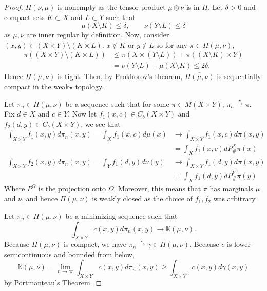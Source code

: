 \documentclass[12pt]{article}
\theoremstyle{plain}
\numberwithin{equation}{section}
\begin{document}
\begin{proof}
  $\Pi(\nu,\mu)$ is nonempty as the tensor product $\mu\otimes \nu$ is in $\Pi$. Let $\delta > 0$ and compact sets $K\subset X$ and $L\subset Y$ such that 
  \[\mu(X\setminus K) \le \delta,\qquad \nu(Y\setminus L)\le \delta\]
  as $\mu,\nu$ are inner regular by definition. Now, consider $(x,y)\in (X\times Y)\setminus (K\times L)$. $x\notin K$ or $y\notin L$ so for any $\pi\in\Pi(\mu,\nu)$, 
  \begin{align*}
    \pi((X\times Y)\setminus (K\times L)) &\le \pi(X\times (Y\setminus L)) + \pi((X\setminus K)\times Y) \\
    &= \nu(Y\setminus L) + \mu(X\setminus K) \le 2\delta.
  \end{align*}
  Hence $\Pi(\mu,\nu)$ is tight. Then, by Prokhorov's theorem, $\overline{\Pi(\mu,\nu)}$ is sequentially compact in the weak$\star$ topology.

  Let $\pi_n\in\Pi(\mu,\nu)$ be a sequence such that for some $\pi\in M(X\times Y)$, $\pi_n\overset{\star}{\rightharpoonup} \pi$. Fix $d\in X$ and $c\in Y$. Now let $f_1(x,c) \in C_b(X\times Y)$ and $f_2(d,y)\in C_b(X\times Y)$, we see that 
  \begin{align*}
    \int_{X\times Y} f_1(x,y)d\pi_n(x,y) = \int_{X} f_1(x,c)d\mu(x) &\to \int_{X\times Y} f_1(x,c)d\pi(x,y) \\
    &= \int_{X} f_1(x,c)dP^X_{\#}\pi(x) \\
    \int_{X\times Y} f_2(x,y)d\pi_n(x,y) = \int_{Y} f_1(d,y)d\nu(y) &\to \int_{X\times Y} f_1(d,y)d\pi(x,y) \\
    &= \int_{X} f_1(d,y)dP^Y_{\#}\pi(y)
  \end{align*}
  Where $P^\Omega$ is the projection onto $\Omega$. Moreover, this means that $\pi$ has marginals $\mu$ and $\nu$, and hence $\Pi(\mu,\nu)$ is weakly closed as the choice of $f_1,f_2$ was arbitrary.

  Let $\pi_n\in \Pi(\mu,\nu)$ be a minimizing sequence such that 
  \[\int_{X\times Y}c(x,y)d\pi_n(x,y) \to \mathbb{K}(\mu,\nu).\]
 Because $\Pi(\mu,\nu)$ is compact, we have $\pi_n\overset{\star}{\rightharpoonup}\gamma\in\Pi(\mu,\nu)$. Because $c$ is lower-semicontinuous and bounded from below,
 \begin{equation}
   \mathbb{K}(\mu,\nu) = \lim_{n\to\infty}\int_{X\times Y}c(x,y)d\pi_n(x,y) \ge \int_{X\times Y} c(x,y)d\gamma(x,y)
 \end{equation}
 by Portmanteau's Theorem.
\end{proof}
\end{document}
